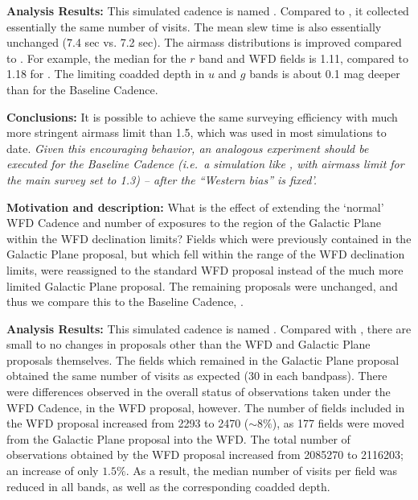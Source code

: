  {\bf Analysis Results:}  This simulated cadence is named
 . Compared to
 , it collected essentially the same number of
 visits. The mean slew time is also essentially unchanged (7.4 sec vs.
 7.2 sec). The airmass distributions is improved compared to
 . For example, the median for the $r$ band and
 WFD fields is 1.11, compared to 1.18 for .  The
 limiting coadded depth in $u$ and $g$ bands is about 0.1 mag deeper than
 for the Baseline Cadence.

{\bf Conclusions:}  It is possible to achieve the same surveying
efficiency with much more stringent airmass limit than 1.5, which was
used in most simulations to date.  {\it Given this encouraging
behavior, an analogous experiment should be executed for the Baseline
Cadence (i.e.\ a simulation like , with airmass
limit for the main survey set to 1.3) -- after the ``Western bias'' is
fixed'.}




{\bf Motivation and description:} What is the effect of extending the
`normal' WFD Cadence and number of exposures to the region of the
Galactic Plane within the WFD declination limits?  Fields which were
previously contained in the Galactic Plane proposal, but which fell
within the range of the WFD declination limits, were reassigned to the
standard WFD proposal instead of the much more limited Galactic Plane
proposal. The remaining proposals were unchanged, and thus we compare
this to the Baseline Cadence, .

 {\bf Analysis Results:}  This simulated cadence is named
 . Compared with
 , there are small to no changes in
 proposals other than the WFD and Galactic Plane proposals
 themselves. The fields which remained in the Galactic Plane proposal
 obtained the same number of visits as expected (30 in each
 bandpass). There were differences observed in the overall status of
 observations taken under the WFD Cadence, in the WFD proposal,
 however. The number of fields included in the WFD proposal increased
 from 2293 to 2470 ($\sim8\%$), as 177 fields were moved from the Galactic Plane
 proposal into the WFD. The total number of observations obtained by
 the WFD proposal increased from 2085270 to 2116203; an increase of
 only $1.5\%$. As a result, the median number of visits per field was
 reduced in all bands, as well as the corresponding coadded depth.

